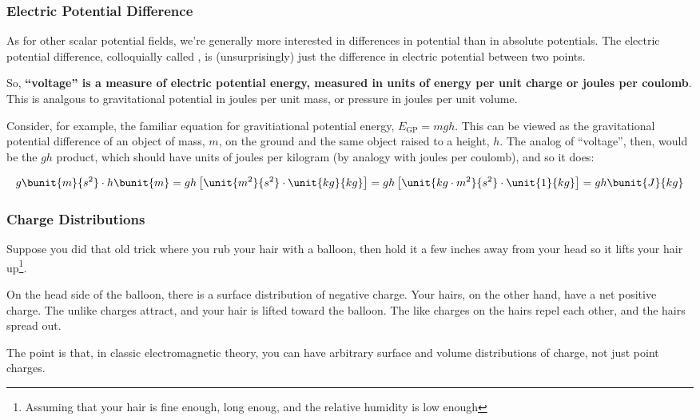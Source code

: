 \subsubsection{Electric Potential Difference}

As for other scalar potential fields, we're generally more interested
in differences in potential than in absolute potentials. The electric
potential difference, colloquially called , is
(unsurprisingly) just the difference in electric potential between two
points.

So, {\bf ``voltage'' is a measure of electric potential energy,
  measured in units of energy per unit charge or joules per
  coulomb}. This is analgous to gravitational potential in joules per
  unit mass, or pressure in joules per unit volume.

Consider, for example, the familiar equation for gravitiational
potential energy, $E_\mathrm{GP} = mgh$. This can be viewed as the
gravitational potential difference of an object of mass, $m$, on the
ground and the same object raised to a height, $h$. The analog of
``voltage'', then, would be the $gh$ product, which should have units
of joules per kilogram (by analogy with joules per coulomb), and so it
does:

\begin{equation}
g\bunit{m}{s^2}\cdot h\bunit{m} = gh\left[\unit{m^2}{s^2}\cdot\unit{kg}{kg}\right] = gh\left[\unit{kg\cdot m^2}{s^2}\cdot\unit{1}{kg}\right] = gh\bunit{J}{kg}
\end{equation}


\subsubsection{Charge Distributions}

Suppose you did that old trick where you rub your hair with a balloon,
then hold it a few inches away from your head so it lifts your hair
up\footnote{Assuming that your hair is fine enough, long enoug, and
  the relative humidity is low enough}.

On the head side of the balloon, there is a surface distribution of
negative charge. Your hairs, on the other hand, have a net positive
charge. The unlike charges attract, and your hair is lifted toward the
balloon. The like charges on the hairs repel each other, and the hairs
spread out.

The point is that, in classic electromagnetic theory, you can have
arbitrary surface and volume distributions of charge, not just point
charges.



